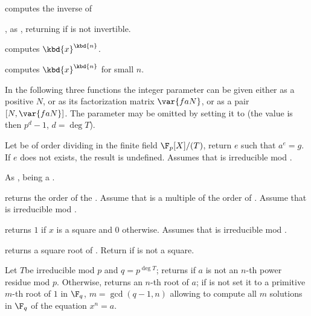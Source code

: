 



 computes the inverse of 

, as , returning
 if  is not invertible.

 computes $\kbd{x}^\kbd{n}$.

 computes $\kbd{x}^\kbd{n}$
for small $n$.

In the following three functions the integer parameter  can be given
either as a positive  $N$, or as its factorization matrix $\var{faN}$,
or as a pair $[N,\var{faN}]$. The parameter may be omitted by setting it to
 (the value is then $p^d-1$, $d = \deg T$).

 Let  be of
order dividing  in the finite field $\F_p[X]/(T)$, return $e$ such that
$a^e=g$. If $e$ does not exists, the result is undefined. Assumes
that  is irreducible mod .

 As
,  being a .

 returns the order of the
 . Assume that  is a multiple of the order of
. Assume that  is irreducible mod .

 returns $1$ if $x$ is a square
and $0$ otherwise. Assumes that  is irreducible mod .

 returns a square root of .
Return  if  is not a square.

Let $T$be irreducible mod $p$ and $q = p^{\deg T}$; returns  if $a$
is not an $n$-th power residue mod $p$. Otherwise, returns an $n$-th root of
$a$; if  is not  set it to a primitive $m$-th root of $1$
in $\F_q$, $m = \gcd(q-1,n)$ allowing to compute all $m$ solutions in $\F_q$
of the equation $x^n = a$.


